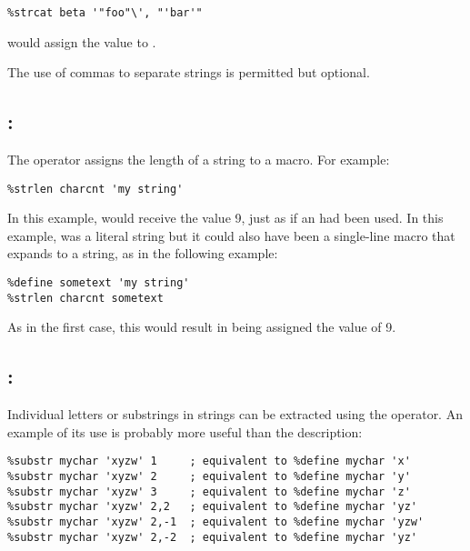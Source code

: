 \begin{lstlisting}
%strcat beta '"foo"\', "'bar'"
\end{lstlisting}

would assign the value 
to .

The use of commas to separate strings is permitted but optional.

\subsection{: }
\label{subsec:strlen}

The  operator assigns the length of a string to a macro.
For example:

\begin{lstlisting}
%strlen charcnt 'my string'
\end{lstlisting}

In this example,  would receive the value 9, just as
if an  had been used. In this example, 
was a literal string but it could also have been a single-line
macro that expands to a string, as in the following example:

\begin{lstlisting}
%define sometext 'my string'
%strlen charcnt sometext
\end{lstlisting}

As in the first case, this would result in  being
assigned the value of 9.

\subsection{: }
\label{subsec:substr}

Individual letters or substrings in strings can be extracted using the
 operator. An example of its use is probably more useful
than the description:

\begin{lstlisting}
%substr mychar 'xyzw' 1     ; equivalent to %define mychar 'x'
%substr mychar 'xyzw' 2     ; equivalent to %define mychar 'y'
%substr mychar 'xyzw' 3     ; equivalent to %define mychar 'z'
%substr mychar 'xyzw' 2,2   ; equivalent to %define mychar 'yz'
%substr mychar 'xyzw' 2,-1  ; equivalent to %define mychar 'yzw'
%substr mychar 'xyzw' 2,-2  ; equivalent to %define mychar 'yz'
\end{lstlisting}

